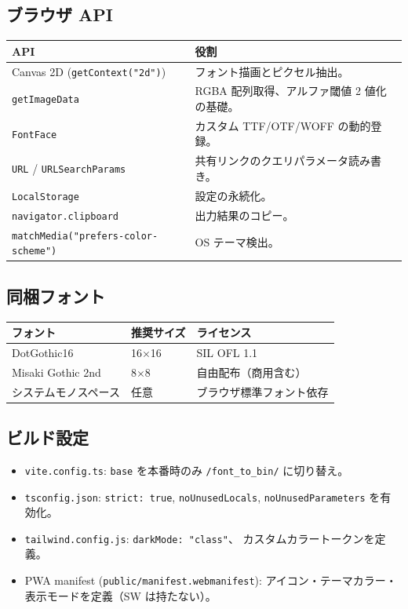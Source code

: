 \subsection{ブラウザ API}

\begin{tabularx}{\textwidth}{l X}
\toprule
\textbf{API} & \textbf{役割} \\
\midrule
Canvas 2D (\texttt{getContext("2d")})     & フォント描画とピクセル抽出。\\
\texttt{getImageData}                     & RGBA 配列取得、アルファ閾値 2 値化の基礎。\\
\texttt{FontFace}                         & カスタム TTF/OTF/WOFF の動的登録。\\
\texttt{URL} / \texttt{URLSearchParams}   & 共有リンクのクエリパラメータ読み書き。\\
\texttt{LocalStorage}                     & 設定の永続化。\\
\texttt{navigator.clipboard}              & 出力結果のコピー。\\
\texttt{matchMedia("prefers-color-scheme")} & OS テーマ検出。\\
\bottomrule
\end{tabularx}

\subsection{同梱フォント}

\begin{tabularx}{\textwidth}{l l X}
\toprule
\textbf{フォント} & \textbf{推奨サイズ} & \textbf{ライセンス} \\
\midrule
DotGothic16       & 16$\times$16 & SIL OFL 1.1 \\
Misaki Gothic 2nd & 8$\times$8   & 自由配布（商用含む）\\
システムモノスペース & 任意       & ブラウザ標準フォント依存 \\
\bottomrule
\end{tabularx}

\subsection{ビルド設定}

\begin{itemize}[leftmargin=*,itemsep=2pt]
  \item \texttt{vite.config.ts}: \texttt{base} を本番時のみ
        \texttt{/font\_to\_bin/} に切り替え。
  \item \texttt{tsconfig.json}: \texttt{strict: true}, \texttt{noUnusedLocals},
        \texttt{noUnusedParameters} を有効化。
  \item \texttt{tailwind.config.js}: \texttt{darkMode: "class"}、
        カスタムカラートークンを定義。
  \item PWA manifest (\texttt{public/manifest.webmanifest}):
        アイコン・テーマカラー・表示モードを定義（SW は持たない）。
\end{itemize}

\newpage
